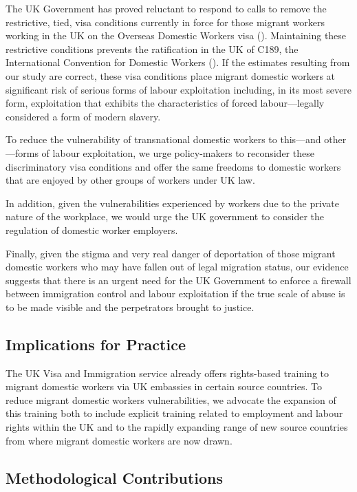 \documentclass[
  12pt,
  letterpaper,
  DIV=11,
  numbers=noendperiod]{scrartcl}
\theoremstyle{plain}
\theoremstyle{definition}
\begin{document}
The UK Government has proved reluctant to respond to calls to remove the
restrictive, tied, visa conditions currently in force for those migrant
workers working in the UK on the Overseas Domestic Workers visa
(\textcite{gower_calls_2016}). Maintaining these restrictive conditions
prevents the ratification in the UK of C189, the International
Convention for Domestic Workers (\textcite{ILO11-indicators}). If the
estimates resulting from our study are correct, these visa conditions
place migrant domestic workers at significant risk of serious forms of
labour exploitation including, in its most severe form, exploitation
that exhibits the characteristics of forced labour---legally considered
a form of modern slavery.

To reduce the vulnerability of transnational domestic workers to
this---and other---forms of labour exploitation, we urge policy-makers
to reconsider these discriminatory visa conditions and offer the same
freedoms to domestic workers that are enjoyed by other groups of workers
under UK law.

In addition, given the vulnerabilities experienced by workers due to the
private nature of the workplace, we would urge the UK government to
consider the regulation of domestic worker employers.

Finally, given the stigma and very real danger of deportation of those
migrant domestic workers who may have fallen out of legal migration
status, our evidence suggests that there is an urgent need for the UK
Government to enforce a firewall between immigration control and labour
exploitation if the true scale of abuse is to be made visible and the
perpetrators brought to justice.

\subsection{Implications for Practice}\label{implications-for-practice}

The UK Visa and Immigration service already offers rights-based training
to migrant domestic workers via UK embassies in certain source
countries. To reduce migrant domestic workers vulnerabilities, we
advocate the expansion of this training both to include explicit
training related to employment and labour rights within the UK and to
the rapidly expanding range of new source countries from where migrant
domestic workers are now drawn.

\subsection{Methodological
Contributions}\label{methodological-contributions}
\end{document}
